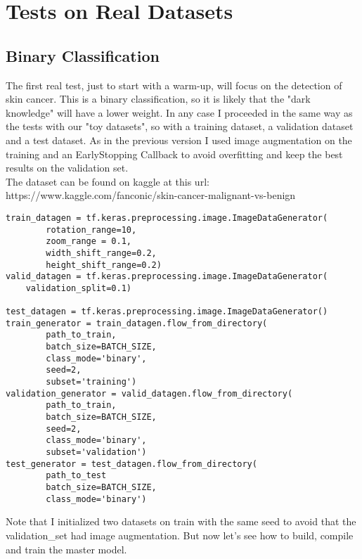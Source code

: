 \section{Tests on Real Datasets}
\subsection{Binary Classification}
The first real test, just to start with a warm-up, will focus on the detection of skin cancer. This is a binary classification, so it is likely that the "dark knowledge" will have a lower weight. In any case I proceeded in the same way as the tests with our "toy datasets", so with a training dataset, a validation dataset and a test dataset. As in the previous version I used image augmentation on the training and an EarlyStopping Callback to avoid overfitting and keep the best results on the validation set.\\
The dataset can be found on kaggle at this url: https://www.kaggle.com/fanconic/skin-cancer-malignant-vs-benign


\lstset{language=Python}
\lstset{frame=lines}
\lstset{basicstyle=\footnotesize}
\begin{lstlisting}
train_datagen = tf.keras.preprocessing.image.ImageDataGenerator(
        rotation_range=10, 
        zoom_range = 0.1, 
        width_shift_range=0.2,  
        height_shift_range=0.2)  
valid_datagen = tf.keras.preprocessing.image.ImageDataGenerator(
    validation_split=0.1)

test_datagen = tf.keras.preprocessing.image.ImageDataGenerator()
train_generator = train_datagen.flow_from_directory(
        path_to_train,
        batch_size=BATCH_SIZE,
        class_mode='binary',
        seed=2,
        subset='training')
validation_generator = valid_datagen.flow_from_directory(
        path_to_train,
        batch_size=BATCH_SIZE,
        seed=2,
        class_mode='binary',
        subset='validation')
test_generator = test_datagen.flow_from_directory(
		path_to_test
        batch_size=BATCH_SIZE,
        class_mode='binary')
\end{lstlisting}

Note that I initialized two datasets on train with the same seed to avoid that the validation\_set had image augmentation. But now let's see how to build, compile and train the master model.

